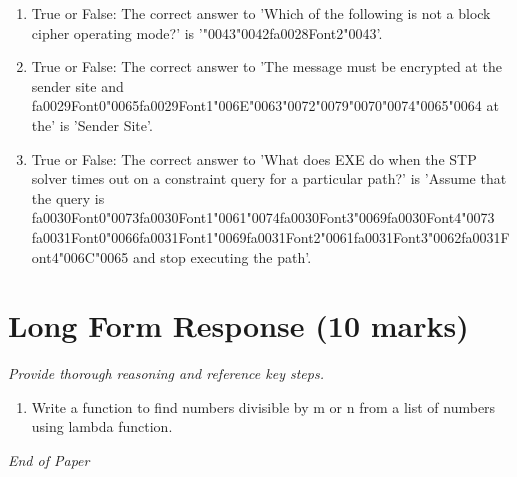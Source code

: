 \documentclass[12pt]{article}
\begin{document}
\begin{enumerate}[label=\arabic*.]
\item True or False: The correct answer to 'Which of the following is not a block cipher operating mode?' is '{\char"0043}{\char"0042}{\csname fa0028Font2\endcsname\char"0043}'.
\item True or False: The correct answer to 'The message must be encrypted at the sender site and {\csname fa0029Font0\endcsname\char"0065}{\csname fa0029Font1\endcsname\char"006E}{\char"0063}{\char"0072}{\char"0079}{\char"0070}{\char"0074}{\char"0065}{\char"0064} at the' is 'Sender Site'.
\item True or False: The correct answer to 'What does EXE do when the STP solver times out on a constraint query for a particular path?' is 'Assume that the query is {\csname fa0030Font0\endcsname\char"0073}{\csname fa0030Font1\endcsname\char"0061}{\char"0074}{\csname fa0030Font3\endcsname\char"0069}{\csname fa0030Font4\endcsname\char"0073} {\csname fa0031Font0\endcsname\char"0066}{\csname fa0031Font1\endcsname\char"0069}{\csname fa0031Font2\endcsname\char"0061}{\csname fa0031Font3\endcsname\char"0062}{\csname fa0031Font4\endcsname\char"006C}{\char"0065} and stop executing the path'.
\end{enumerate}

\section*{Long Form Response (10 marks)}
\textit{Provide thorough reasoning and reference key steps.}
\begin{enumerate}[label=\arabic*.]
\item Write a function to find numbers divisible by m or n from a list of numbers using lambda
function.
\end{enumerate}

\vfill
\noindent\textit{End of Paper}
\end{document}
